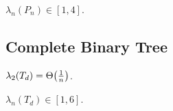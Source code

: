 \begin{exc}\label{exc:spectrum_path_graph_n}
$\lambda_n(P_n) \in [1,4]$.
\end{exc}

\subsection{Complete Binary Tree}

\begin{exc}\label{exc:spectrum_complete_binary_tree_2}
$\lambda_2(T_d) = \Theta\parentheses*{\frac{1}{n}}$.
\end{exc}

\begin{exc}\label{exc:spectrum_complete_binary_tree_n}
$\lambda_n(T_d) \in [1,6]$.
\end{exc}
